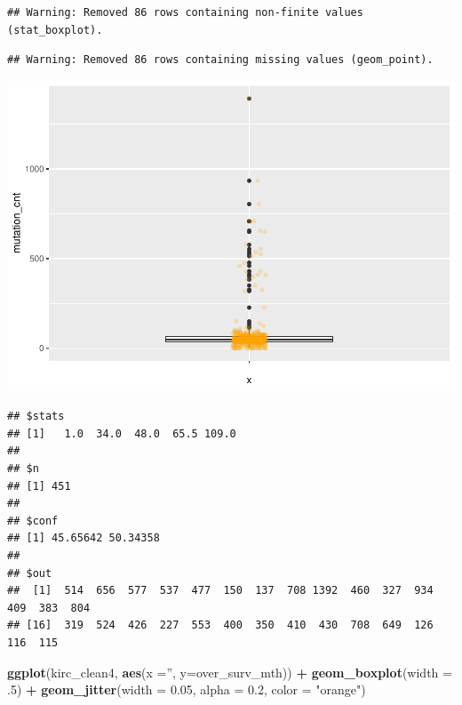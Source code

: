 \documentclass[]{article}
\newenvironment{Shaded}{\begin{snugshade}}{\end{snugshade}}
\newcommand{\KeywordTok}[1]{\textcolor[rgb]{0.13,0.29,0.53}{\textbf{#1}}}
\newcommand{\DataTypeTok}[1]{\textcolor[rgb]{0.13,0.29,0.53}{#1}}
\newcommand{\DecValTok}[1]{\textcolor[rgb]{0.00,0.00,0.81}{#1}}
\newcommand{\FloatTok}[1]{\textcolor[rgb]{0.00,0.00,0.81}{#1}}
\newcommand{\StringTok}[1]{\textcolor[rgb]{0.31,0.60,0.02}{#1}}
\newcommand{\OperatorTok}[1]{\textcolor[rgb]{0.81,0.36,0.00}{\textbf{#1}}}
\newcommand{\NormalTok}[1]{#1}
\begin{document}
\begin{verbatim}
## Warning: Removed 86 rows containing non-finite values (stat_boxplot).
\end{verbatim}

\begin{verbatim}
## Warning: Removed 86 rows containing missing values (geom_point).
\end{verbatim}

\includegraphics{figs/render-unnamed-chunk-23-1.pdf}

\begin{Shaded}
\end{Shaded}

\begin{verbatim}
## $stats
## [1]   1.0  34.0  48.0  65.5 109.0
## 
## $n
## [1] 451
## 
## $conf
## [1] 45.65642 50.34358
## 
## $out
##  [1]  514  656  577  537  477  150  137  708 1392  460  327  934  409  383  804
## [16]  319  524  426  227  553  400  350  410  430  708  649  126  116  115
\end{verbatim}

\begin{Shaded}
\begin{Highlighting}[]
\KeywordTok{ggplot}\NormalTok{(kirc_clean4, }\KeywordTok{aes}\NormalTok{(}\DataTypeTok{x =}\StringTok{''}\NormalTok{, }\DataTypeTok{y=}\NormalTok{over_surv_mth)) }\OperatorTok{+}
\StringTok{     }\KeywordTok{geom_boxplot}\NormalTok{(}\DataTypeTok{width =}\NormalTok{ .}\DecValTok{5}\NormalTok{) }\OperatorTok{+}
\StringTok{     }\KeywordTok{geom_jitter}\NormalTok{(}\DataTypeTok{width =} \FloatTok{0.05}\NormalTok{, }\DataTypeTok{alpha =} \FloatTok{0.2}\NormalTok{, }\DataTypeTok{color =} \StringTok{"orange"}\NormalTok{)}
\end{Highlighting}
\end{Shaded}
\end{document}
